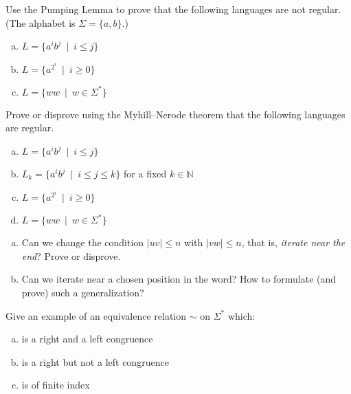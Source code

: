 \documentclass[a4paper,12pt]{amsart}
\begin{document}
\medskip\begin{problem}
    
    Use the Pumping Lemma to prove that the following languages are not regular. (The alphabet is $\Sigma=\{a,b\}$.)
          
    \begin{enumerate}[(a)]\setlength\itemsep{6pt}
        \item $L=\{a^ib^j\ \mid\ i\leq j\}$        
        \item $L=\{a^{2^i}\ \mid\ i\geq 0\}$
        \item $L=\{ww\ \mid \ w\in\Sigma^*\}$
    \end{enumerate}
    
\end{problem}


\medskip\begin{problem}

    Prove or disprove using the Myhill--Nerode theorem that the following languages are regular.
    \begin{enumerate}[(a)]\setlength\itemsep{6pt}
        \item $L=\{a^ib^j\ \mid\ i\leq j\}$
        \item $L_k=\{a^ib^j\ \mid\ i\leq j\leq k\}$ for a fixed $k\in\mathbb N$
        \item $L=\{a^{2^i}\ \mid\ i\geq 0\}$
        \item $L=\{ww\ \mid \ w\in\Sigma^*\}$
    \end{enumerate}

\end{problem}


\medskip\begin{problem}
    
    \begin{enumerate}[(a)]\setlength\itemsep{6pt}
        \item Can we change the condition $|uv|\leq n$ with $|vw|\leq n$, that is, \emph{iterate near the end}? Prove or disprove.
        \item Can we iterate near a chosen position in the word? How to formulate (and prove) such a generalization?
    \end{enumerate}
    
\end{problem}


\medskip\begin{problem}

    Give an example of an equivalence relation $\sim$ on $\Sigma^*$ which:

    \medskip
    
    \begin{enumerate}[(a)]\setlength\itemsep{12pt}
        \item is a right and a left congruence
        \item is a right but not a left congruence
        \item is of finite index
    \end{enumerate}

\end{problem}
\end{document}
